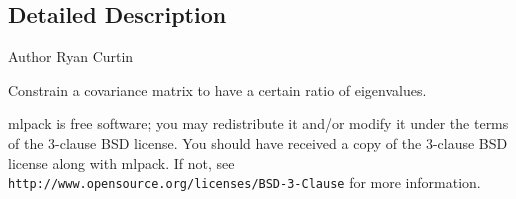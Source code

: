 \subsection{Detailed Description}
\begin{DoxyAuthor}{Author}
Ryan Curtin
\end{DoxyAuthor}
Constrain a covariance matrix to have a certain ratio of eigenvalues.

mlpack is free software; you may redistribute it and/or modify it under the terms of the 3-\/clause B\+SD license. You should have received a copy of the 3-\/clause B\+SD license along with mlpack. If not, see {\tt http\+://www.\+opensource.\+org/licenses/\+B\+S\+D-\/3-\/\+Clause} for more information. 